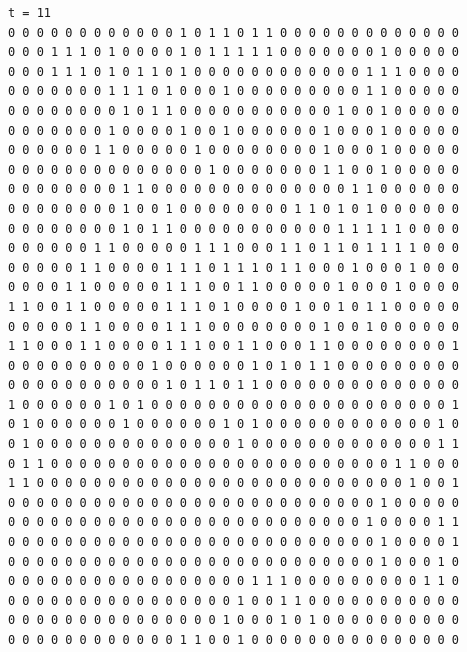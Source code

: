 \documentclass[a4paper,12pt]{article}
\begin{document}
\begin{verbatim}
t = 11
0 0 0 0 0 0 0 0 0 0 0 0 1 0 1 1 0 1 1 0 0 0 0 0 0 0 0 0 0 0 0 0 
0 0 0 1 1 1 0 1 0 0 0 0 1 0 1 1 1 1 1 0 0 0 0 0 0 0 1 0 0 0 0 0 
0 0 0 1 1 1 0 1 0 1 1 0 1 0 0 0 0 0 0 0 0 0 0 0 0 1 1 1 0 0 0 0 
0 0 0 0 0 0 0 1 1 1 0 1 0 0 0 1 0 0 0 0 0 0 0 0 0 1 1 0 0 0 0 0 
0 0 0 0 0 0 0 0 1 0 1 1 0 0 0 0 0 0 0 0 0 0 0 1 0 0 1 0 0 0 0 0 
0 0 0 0 0 0 0 1 0 0 0 0 1 0 0 1 0 0 0 0 0 0 1 0 0 0 1 0 0 0 0 0 
0 0 0 0 0 0 1 1 0 0 0 0 0 1 0 0 0 0 0 0 0 0 1 0 0 0 1 0 0 0 0 0 
0 0 0 0 0 0 0 0 0 0 0 0 0 0 1 0 0 0 0 0 0 0 1 1 0 0 1 0 0 0 0 0 
0 0 0 0 0 0 0 0 1 1 0 0 0 0 0 0 0 0 0 0 0 0 0 0 1 1 0 0 0 0 0 0 
0 0 0 0 0 0 0 0 1 0 0 1 0 0 0 0 0 0 0 0 1 1 0 1 0 1 0 0 0 0 0 0 
0 0 0 0 0 0 0 0 1 0 1 1 0 0 0 0 0 0 0 0 0 0 0 1 1 1 1 1 0 0 0 0 
0 0 0 0 0 0 1 1 0 0 0 0 0 1 1 1 0 0 0 1 1 0 1 1 0 1 1 1 1 0 0 0 
0 0 0 0 0 1 1 0 0 0 0 1 1 1 0 1 1 1 0 1 1 0 0 0 1 0 0 0 1 0 0 0 
0 0 0 0 1 1 0 0 0 0 0 1 1 1 0 0 1 1 0 0 0 0 0 1 0 0 0 1 0 0 0 0 
1 1 0 0 1 1 0 0 0 0 0 1 1 1 0 1 0 0 0 0 1 0 0 1 0 1 1 0 0 0 0 0 
0 0 0 0 0 1 1 0 0 0 0 1 1 1 0 0 0 0 0 0 0 0 1 0 0 1 0 0 0 0 0 0 
1 1 0 0 0 1 1 0 0 0 0 1 1 1 0 0 1 1 0 0 0 1 1 0 0 0 0 0 0 0 0 1 
0 0 0 0 0 0 0 0 0 0 1 0 0 0 0 0 0 1 0 1 0 1 1 0 0 0 0 0 0 0 0 0 
0 0 0 0 0 0 0 0 0 0 0 1 0 1 1 0 1 1 0 0 0 0 0 0 0 0 0 0 0 0 0 0 
1 0 0 0 0 0 0 1 0 1 0 0 0 0 0 0 0 0 0 0 0 0 0 0 0 0 0 0 0 0 0 1 
0 1 0 0 0 0 0 0 1 0 0 0 0 0 0 1 0 1 0 0 0 0 0 0 0 0 0 0 0 0 1 0 
0 1 0 0 0 0 0 0 0 0 0 0 0 0 0 0 1 0 0 0 0 0 0 0 0 0 0 0 0 0 1 1 
0 1 1 0 0 0 0 0 0 0 0 0 0 0 0 0 0 0 0 0 0 0 0 0 0 0 0 1 1 0 0 0 
1 1 0 0 0 0 0 0 0 0 0 0 0 0 0 0 0 0 0 0 0 0 0 0 0 0 0 0 1 0 0 1 
0 0 0 0 0 0 0 0 0 0 0 0 0 0 0 0 0 0 0 0 0 0 0 0 0 0 1 0 0 0 0 0 
0 0 0 0 0 0 0 0 0 0 0 0 0 0 0 0 0 0 0 0 0 0 0 0 0 1 0 0 0 0 1 1 
0 0 0 0 0 0 0 0 0 0 0 0 0 0 0 0 0 0 0 0 0 0 0 0 0 0 1 0 0 0 0 1 
0 0 0 0 0 0 0 0 0 0 0 0 0 0 0 0 0 0 0 0 0 0 0 0 0 0 1 0 0 0 1 0 
0 0 0 0 0 0 0 0 0 0 0 0 0 0 0 0 0 1 1 1 0 0 0 0 0 0 0 0 0 1 1 0 
0 0 0 0 0 0 0 0 0 0 0 0 0 0 0 0 1 0 0 1 1 0 0 0 0 0 0 0 0 0 0 0 
0 0 0 0 0 0 0 0 0 0 0 0 0 0 0 1 0 0 0 1 0 1 0 0 0 0 0 0 0 0 0 0 
0 0 0 0 0 0 0 0 0 0 0 0 1 1 0 0 1 0 0 0 0 0 0 0 0 0 0 0 0 0 0 0 




\end{verbatim}
\end{document}
